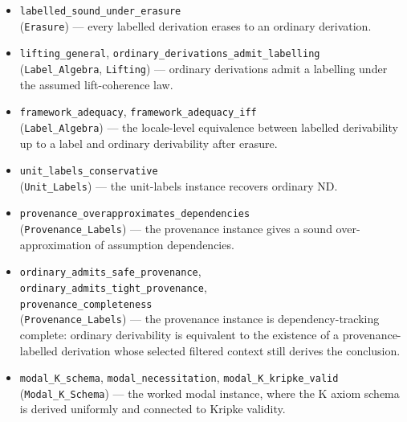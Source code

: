 \documentclass[11pt,a4paper]{article}
\begin{document}
\begin{sloppypar}
\begin{itemize}
  \item \texttt{labelled\_sound\_under\_erasure} \\
        (\texttt{Erasure}) --- every labelled derivation erases to an
        ordinary derivation.
  \item \texttt{lifting\_general},
        \texttt{ordinary\_derivations\_admit\_labelling} \\
        (\texttt{Label\_Algebra}, \texttt{Lifting}) --- ordinary
        derivations admit a labelling under the assumed lift-coherence
        law.
  \item \texttt{framework\_adequacy},
        \texttt{framework\_adequacy\_iff} \\
        (\texttt{Label\_Algebra}) --- the locale-level equivalence
        between labelled derivability up to a label and ordinary
        derivability after erasure.
  \item \texttt{unit\_labels\_conservative} \\
        (\texttt{Unit\_Labels}) --- the unit-labels instance recovers
        ordinary ND.
  \item \texttt{provenance\_overapproximates\_dependencies} \\
        (\texttt{Provenance\_Labels}) --- the provenance instance gives
        a sound over-approximation of assumption dependencies.
  \item \texttt{ordinary\_admits\_safe\_provenance}, \\
        \texttt{ordinary\_admits\_tight\_provenance}, \\
        \texttt{provenance\_completeness} \\
        (\texttt{Provenance\_Labels}) --- the provenance instance is
        dependency-tracking complete: ordinary derivability is
        equivalent to the existence of a provenance-labelled derivation
        whose selected filtered context still derives the conclusion.
  \item \texttt{modal\_K\_schema}, \texttt{modal\_necessitation},
        \texttt{modal\_K\_kripke\_valid} \\
        (\texttt{Modal\_K\_Schema}) --- the worked modal instance, where
        the K axiom schema is derived uniformly and connected to Kripke
        validity.
\end{itemize}
\end{sloppypar}
\end{document}
